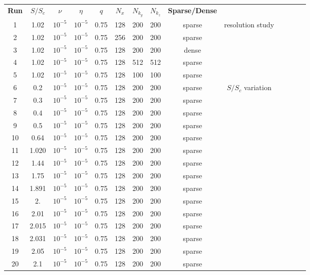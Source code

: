 \documentclass[openacc]{rsproca_new}%
\newcommand{\SSC}{S/S_{c}}
\begin{document}
\begin{tabular}{cccccccccccccc}
\textbf{Run} & \textbf{$\SSC$} & \textbf{$\nu$} & \textbf{$\eta$} & \textbf{$q$} & \textbf{$N_x$} & \textbf{$N_{k_y}$} & \textbf{$N_{k_z}$} & \textbf{Sparse/Dense}& \\
1  &   1.02 & $10^{-5}$ & $10^{-5}$ & 0.75 & 128 & 200 & 200 & sparse & resolution study\\
2  &   1.02 & $10^{-5}$ & $10^{-5}$ & 0.75 & 256 & 200 & 200 & sparse & \\
3  &   1.02 & $10^{-5}$ & $10^{-5}$ & 0.75 & 128 & 200 & 200 & dense  & \\
4  &   1.02 & $10^{-5}$ & $10^{-5}$ & 0.75 & 128 & 512 & 512 & sparse & \\
5  &   1.02 & $10^{-5}$ & $10^{-5}$ & 0.75 & 128 & 100 & 100 & sparse & \\
6  &   0.2  & $10^{-5}$ & $10^{-5}$ & 0.75 & 128 & 200 & 200 & sparse & $\SSC$ variation\\
7  &   0.3  & $10^{-5}$ & $10^{-5}$ & 0.75 & 128 & 200 & 200 & sparse & \\
8  &   0.4  & $10^{-5}$ & $10^{-5}$ & 0.75 & 128 & 200 & 200 & sparse & \\
9  &   0.5  & $10^{-5}$ & $10^{-5}$ & 0.75 & 128 & 200 & 200 & sparse & \\
10 &   0.64 & $10^{-5}$ & $10^{-5}$ & 0.75 & 128 & 200 & 200 & sparse & \\
11 & 1.020  & $10^{-5}$ & $10^{-5}$ & 0.75 & 128 & 200 & 200 & sparse & \\
12 & 1.44   & $10^{-5}$ & $10^{-5}$ & 0.75 & 128 & 200 & 200 & sparse & \\
13 & 1.75   & $10^{-5}$ & $10^{-5}$ & 0.75 & 128 & 200 & 200 & sparse & \\
14 & 1.891  & $10^{-5}$ & $10^{-5}$ & 0.75 & 128 & 200 & 200 & sparse & \\
15 & 2.     & $10^{-5}$ & $10^{-5}$ & 0.75 & 128 & 200 & 200 & sparse & \\
16 & 2.01   & $10^{-5}$ & $10^{-5}$ & 0.75 & 128 & 200 & 200 & sparse & \\
17 & 2.015  & $10^{-5}$ & $10^{-5}$ & 0.75 & 128 & 200 & 200 & sparse & \\
18 & 2.031  & $10^{-5}$ & $10^{-5}$ & 0.75 & 128 & 200 & 200 & sparse & \\
19 & 2.05   & $10^{-5}$ & $10^{-5}$ & 0.75 & 128 & 200 & 200 & sparse & \\
20 & 2.1    & $10^{-5}$ & $10^{-5}$ & 0.75 & 128 & 200 & 200 & sparse & \\

\end{tabular}
\end{document}
